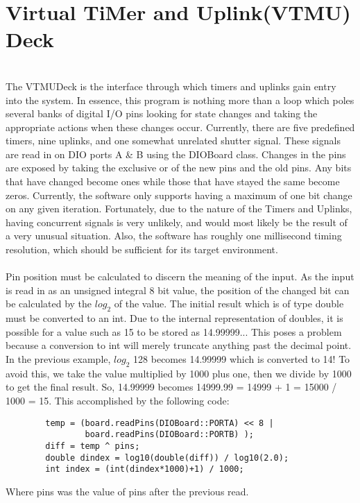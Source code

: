 %
\section{\bf V\rm irtual \bf T\rm i\bf M\rm er and \bf U\rm plink(VTMU) Deck }
\hrulefill
\\ 
The VTMUDeck is the interface through which timers and uplinks gain entry into 
the system. In essence, this program is nothing more than a loop which poles 
several banks of digital I/O pins looking for state changes and taking the appropriate 
actions when these changes occur. Currently, there are five predefined timers, 
nine uplinks, and one somewhat unrelated shutter signal. These signals are read 
in on DIO ports A \& B using the DIOBoard class. Changes in the pins are exposed 
by taking the exclusive or of the new pins and the old pins. Any bits that have 
changed become ones while those that have stayed the same become zeros. Currently, 
the software only supports having a maximum of one bit change on any given iteration. 
Fortunately, due to the nature of the Timers and Uplinks, having concurrent signals 
is very unlikely, and would most likely be the result of a very unusual situation. Also, 
the software has roughly one millisecond timing resolution, which should be sufficient 
for its target environment.
\\
\\
Pin position must be calculated to discern the meaning of the input. As the input is
 read in as an unsigned integral 8 bit value, the position of the changed bit can be
 calculated by the $log_2$ of the value. The initial result which is of type double 
must be converted to an int. Due to the internal representation of doubles, it is possible 
for a value such as 15 to be stored as 14.99999... This poses a problem because a conversion 
to int will merely truncate anything past the decimal point. In the previous example, 
$log_2$ 128 becomes 14.99999 which is converted to 14! To avoid this, we take the value 
multiplied by 1000 plus one, then we divide by 1000 to get the final result. So, 14.99999 
becomes 14999.99 = 14999 + 1 = 15000 / 1000 = 15. This accomplished by the following code:

\begin{verbatim}
        temp = (board.readPins(DIOBoard::PORTA) << 8 | 
                board.readPins(DIOBoard::PORTB) );
        diff = temp ^ pins; 
        double dindex = log10(double(diff)) / log10(2.0);
        int index = (int(dindex*1000)+1) / 1000;
\end{verbatim}
Where pins was the value of pins after the previous read.

